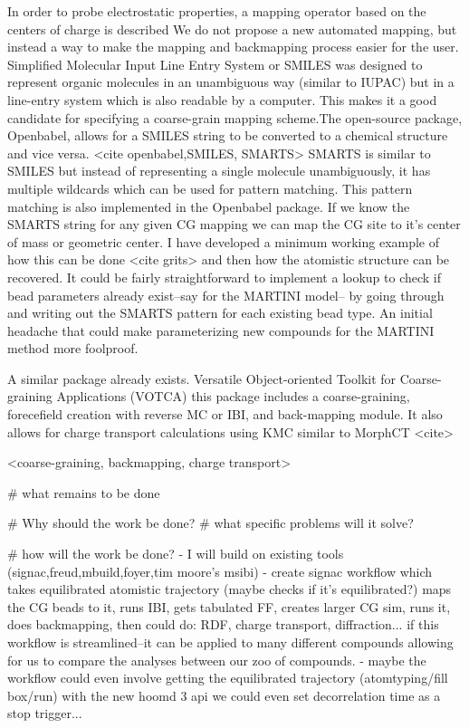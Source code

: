 In order to probe electrostatic properties, a mapping operator based on the centers of charge is described\cite{Cao2015a}
We do not propose a new automated mapping, but instead a way to make the mapping and backmapping process easier for the user.
Simplified Molecular Input Line Entry System or SMILES \cite{Weininger} was designed to represent organic molecules in an unambiguous way (similar to IUPAC) but in a line-entry system which is also readable by a computer.
This makes it a good candidate for specifying a coarse-grain mapping scheme.The open-source package, Openbabel, allows for a SMILES string to be converted to a chemical structure and vice versa. <cite openbabel,SMILES, SMARTS> SMARTS is similar to SMILES but instead of representing a single molecule unambiguously, it has multiple wildcards which can be used for pattern matching. This pattern matching is also implemented in the Openbabel package. If we know the SMARTS string for any given CG mapping we can map the CG site to it's center of mass or geometric center.
I have developed a minimum working example of how this can be done <cite grits> and then how the atomistic structure can be recovered. It could be fairly straightforward to implement a lookup to check if bead parameters already exist--say for the MARTINI model-- by going through and writing out the SMARTS pattern for each existing bead type. An initial headache that could make parameterizing new compounds for the MARTINI method more foolproof.

A similar package already exists. Versatile Object-oriented Toolkit for Coarse-graining Applications (VOTCA) \cite{Ruhle2011b}
this package includes a coarse-graining, forecefield creation with reverse MC or IBI, and back-mapping module. It also allows for charge transport calculations using KMC similar to MorphCT <cite>

<coarse-graining, backmapping, charge transport>

# what remains to be done

# Why should the work be done?
# what specific problems will it solve?

# how will the work be done?
- I will build on existing tools (signac,freud,mbuild,foyer,tim moore's msibi)
- create signac workflow which takes equilibrated atomistic trajectory (maybe checks if it's equilibrated?) maps the CG beads to it, runs IBI, gets tabulated FF, creates larger CG sim, runs it, does backmapping, then could do: RDF, charge transport, diffraction... if this workflow is streamlined--it can be applied to many different compounds allowing for us to compare the analyses between our zoo of compounds.
- maybe the workflow could even involve getting the equilibrated trajectory (atomtyping/fill box/run) with the new hoomd 3 api we could even set decorrelation time as a stop trigger...

